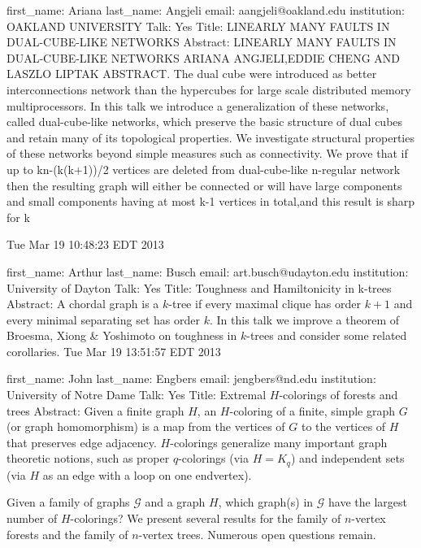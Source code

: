 \documentclass{article}
\begin{document}
first_name: Ariana
last_name: Angjeli
email: aangjeli@oakland.edu
institution: OAKLAND UNIVERSITY
Talk: Yes
Title: LINEARLY MANY FAULTS IN DUAL-CUBE-LIKE NETWORKS
Abstract: LINEARLY MANY FAULTS IN DUAL-CUBE-LIKE NETWORKS
   ARIANA ANGJELI,EDDIE CHENG AND LASZLO LIPTAK
 ABSTRACT. The dual cube were introduced as better interconnections network than the hypercubes for large scale distributed memory multiprocessors. In this talk we introduce a generalization of these networks, called dual-cube-like networks, which preserve the basic structure of dual cubes and retain many of its topological properties. We investigate structural properties of these networks beyond simple measures such as connectivity. We prove that if up to kn-(k(k+1))/2 vertices are deleted from dual-cube-like n-regular network then the resulting graph will either be connected or will have large components and small components having at most k-1 vertices in total,and this result is sharp for k%


Tue Mar 19 10:48:23 EDT 2013

first_name: Arthur
last_name: Busch
email: art.busch@udayton.edu
institution: University of Dayton
Talk: Yes
Title: Toughness and Hamiltonicity in k-trees
Abstract: A chordal graph is a $k$-tree if every maximal clique has order $k+1$ and every minimal separating set has order $k$.  In this talk we improve a theorem of Broesma, Xiong & Yoshimoto on toughness in $k$-trees and consider some related corollaries.
Tue Mar 19 13:51:57 EDT 2013

first_name: John
last_name: Engbers
email: jengbers@nd.edu
institution: University of Notre Dame
Talk: Yes
Title: Extremal $H$-colorings of forests and trees
Abstract: Given a finite graph $H$, an $H$-coloring of a finite, simple graph $G$ (or graph homomorphism) is a map from the vertices of $G$ to the vertices of $H$ that preserves edge adjacency.  $H$-colorings generalize many important graph theoretic notions, such as proper $q$-colorings (via $H = K_{q}$) and independent sets (via $H$ as an edge with a loop on one endvertex).

Given a family of graphs $\mathcal{G}$ and a graph $H$, which graph(s) in $\mathcal{G}$ have the largest number of $H$-colorings?  We present several results for the family of $n$-vertex forests and the family of $n$-vertex trees.  Numerous open questions remain.
\end{document}
